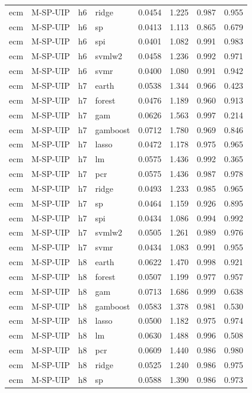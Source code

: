 \begin{ThreePartTable}
\begin{longtable}[t]{llclcccc}
ecm & M-SP-UIP & h6 & ridge & 0.0454 & 1.225 & 0.987 & 0.955\\
ecm & M-SP-UIP & h6 & sp & 0.0413 & 1.113 & 0.865 & 0.679\\
ecm & M-SP-UIP & h6 & spi & 0.0401 & 1.082 & 0.991 & 0.983\\
ecm & M-SP-UIP & h6 & svmlw2 & 0.0458 & 1.236 & 0.992 & 0.971\\
ecm & M-SP-UIP & h6 & svmr & 0.0400 & 1.080 & 0.991 & 0.942\\
\addlinespace
ecm & M-SP-UIP & h7 & earth & 0.0538 & 1.344 & 0.966 & 0.423\\
ecm & M-SP-UIP & h7 & forest & 0.0476 & 1.189 & 0.960 & 0.913\\
ecm & M-SP-UIP & h7 & gam & 0.0626 & 1.563 & 0.997 & 0.214\\
ecm & M-SP-UIP & h7 & gamboost & 0.0712 & 1.780 & 0.969 & 0.846\\
ecm & M-SP-UIP & h7 & lasso & 0.0472 & 1.178 & 0.975 & 0.965\\
ecm & M-SP-UIP & h7 & lm & 0.0575 & 1.436 & 0.992 & 0.365\\
ecm & M-SP-UIP & h7 & pcr & 0.0575 & 1.436 & 0.987 & 0.978\\
ecm & M-SP-UIP & h7 & ridge & 0.0493 & 1.233 & 0.985 & 0.965\\
ecm & M-SP-UIP & h7 & sp & 0.0464 & 1.159 & 0.926 & 0.895\\
ecm & M-SP-UIP & h7 & spi & 0.0434 & 1.086 & 0.994 & 0.992\\
ecm & M-SP-UIP & h7 & svmlw2 & 0.0505 & 1.261 & 0.989 & 0.976\\
ecm & M-SP-UIP & h7 & svmr & 0.0434 & 1.083 & 0.991 & 0.955\\
\addlinespace
ecm & M-SP-UIP & h8 & earth & 0.0622 & 1.470 & 0.998 & 0.921\\
ecm & M-SP-UIP & h8 & forest & 0.0507 & 1.199 & 0.977 & 0.957\\
ecm & M-SP-UIP & h8 & gam & 0.0713 & 1.686 & 0.999 & 0.638\\
ecm & M-SP-UIP & h8 & gamboost & 0.0583 & 1.378 & 0.981 & 0.530\\
ecm & M-SP-UIP & h8 & lasso & 0.0500 & 1.182 & 0.975 & 0.974\\
ecm & M-SP-UIP & h8 & lm & 0.0630 & 1.488 & 0.996 & 0.508\\
ecm & M-SP-UIP & h8 & pcr & 0.0609 & 1.440 & 0.986 & 0.980\\
ecm & M-SP-UIP & h8 & ridge & 0.0525 & 1.240 & 0.986 & 0.975\\
ecm & M-SP-UIP & h8 & sp & 0.0588 & 1.390 & 0.986 & 0.973\\

\end{longtable}
\end{ThreePartTable}
